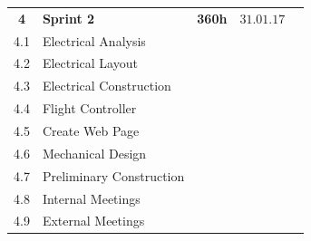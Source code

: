 \begin{center}
\begin{tabular}{cllll}
\\\rowcolor{gainsboro}
\textbf{4} & \textbf{Sprint 2}     & \textbf{360h}     & $31.01.17$ \\
4.1     & Electrical Analysis &  &  \\\rowcolor{gainsboro}
4.2     & Electrical Layout &  & \\
4.3     & Electrical Construction & & \\ \rowcolor{gainsboro}
4.4     & Flight Controller & & \\
4.5     & Create Web Page & &  
\\\rowcolor{gainsboro}
4.6     & Mechanical Design & & \\
4.7     & Preliminary Construction & & 
\\\rowcolor{gainsboro}
4.8       & Internal Meetings      &    & \\
4.9       & External Meetings      &    & 
\end{tabular}                                                                   
\end{center}
\newpage

